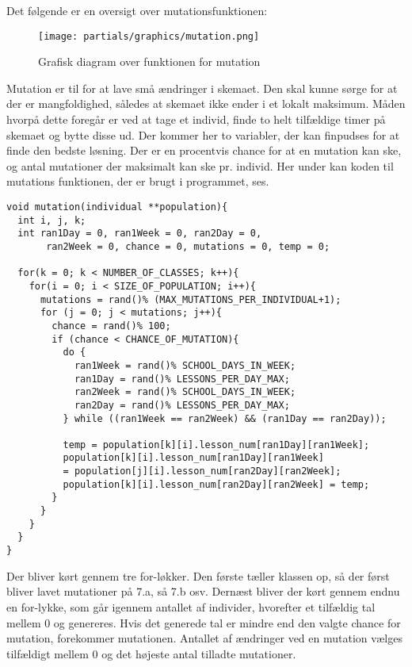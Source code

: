 Det følgende er en oversigt over mutationsfunktionen:
\begin{figure}[!h]
\texttt{[image: partials/graphics/mutation.png]}
\caption{Grafisk diagram over funktionen for mutation}
\label{fig:diagrammutation}
\end{figure}

Mutation er til for at lave små ændringer i skemaet. Den skal kunne sørge for at der er mangfoldighed, således at skemaet ikke ender i et lokalt maksimum. 
Måden hvorpå dette foregår er ved at tage et individ, finde to helt tilfældige timer på skemaet og bytte disse ud. Der kommer her to variabler, der kan finpudses for at finde den bedste løsning. Der er en procentvis chance for at en mutation kan ske, og antal mutationer der maksimalt kan ske pr. individ. 
Her under kan koden til mutations funktionen, der er brugt i programmet, ses.
\begin{lstlisting}
void mutation(individual **population){
  int i, j, k; 
  int ran1Day = 0, ran1Week = 0, ran2Day = 0, 
       ran2Week = 0, chance = 0, mutations = 0, temp = 0;

  for(k = 0; k < NUMBER_OF_CLASSES; k++){
    for(i = 0; i < SIZE_OF_POPULATION; i++){
      mutations = rand()% (MAX_MUTATIONS_PER_INDIVIDUAL+1);
      for (j = 0; j < mutations; j++){
        chance = rand()% 100;
        if (chance < CHANCE_OF_MUTATION){
          do {
            ran1Week = rand()% SCHOOL_DAYS_IN_WEEK;
            ran1Day = rand()% LESSONS_PER_DAY_MAX;
            ran2Week = rand()% SCHOOL_DAYS_IN_WEEK;
            ran2Day = rand()% LESSONS_PER_DAY_MAX;
          } while ((ran1Week == ran2Week) && (ran1Day == ran2Day));
        
          temp = population[k][i].lesson_num[ran1Day][ran1Week];
          population[k][i].lesson_num[ran1Day][ran1Week] 
          = population[j][i].lesson_num[ran2Day][ran2Week];
          population[k][i].lesson_num[ran2Day][ran2Week] = temp;
        }
      }
    }
  }
}
\end{lstlisting}

Der bliver kørt gennem tre for-løkker. Den første tæller klassen op, så der først bliver lavet mutationer på 7.a, så 7.b osv. Dernæst bliver der kørt gennem endnu en for-lykke, som går igennem antallet af individer, hvorefter et tilfældig tal mellem 0 og genereres. Hvis det generede tal er mindre end den valgte chance for mutation, forekommer mutationen. Antallet af ændringer ved en mutation vælges tilfældigt mellem 0 og det højeste antal tilladte mutationer. 